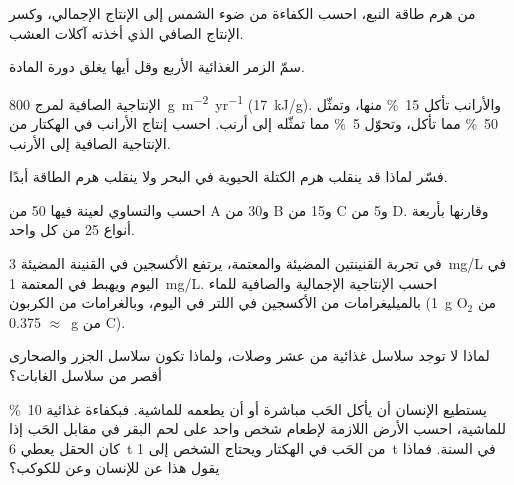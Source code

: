 \begin{exercise}[$\star$]\label{exo:b1:ecosystem-organization:3}
من هرم طاقة النبع، احسب الكفاءة من ضوء الشمس إلى الإنتاج
الإجمالي، وكسر الإنتاج الصافي الذي أخذته آكلات العشب.
\end{exercise}

\begin{exercise}[$\star$]\label{exo:b1:ecosystem-organization:4}
سمّ الزمر الغذائية الأربع وقل أيها يغلق دورة المادة.
\end{exercise}

\begin{exercise}[$\star\star$]\label{exo:b1:ecosystem-organization:5}
الإنتاجية الصافية لمرج \qty{800}{g.m^{-2}.yr^{-1}} (\qty{17}{kJ/g}).
والأرانب تأكل \qty{15}{\%} منها، وتمثّل \qty{50}{\%} مما
تأكل، وتحوّل \qty{5}{\%} مما تمثّله إلى أرنب. احسب
إنتاج الأرانب في الهكتار  من الإنتاجية الصافية
إلى الأرنب.
\end{exercise}

\begin{exercise}[$\star\star$]\label{exo:b1:ecosystem-organization:6}
فسّر لماذا قد ينقلب هرم الكتلة الحيوية في البحر ولا ينقلب هرم
الطاقة أبدًا.
\end{exercise}

\begin{exercise}[$\star\star$]\label{exo:b1:ecosystem-organization:7}
احسب  والتساوي لعينة فيها 50 من A و30 من B و15
من C و5 من D. وقارنها بأربعة أنواع 25 من كل واحد.
\end{exercise}

\begin{exercise}[$\star\star$]\label{exo:b1:ecosystem-organization:8}
في تجربة القنينتين المضيئة والمعتمة، يرتفع الأكسجين في القنينة
المضيئة \qty{3}{mg/L} في اليوم ويهبط في المعتمة
\qty{1}{mg/L}. احسب الإنتاجية الإجمالية والصافية للماء
بالميليغرامات من الأكسجين في اللتر في اليوم، وبالغرامات من الكربون
(\qty{1}{g} من $\mathrm{O_2}$ $\approx$ \qty{0.375}{g} من C).
\end{exercise}

\begin{exercise}[$\star\star$]\label{exo:b1:ecosystem-organization:9}
لماذا لا توجد سلاسل غذائية من عشر وصلات، ولماذا تكون سلاسل الجزر
والصحارى أقصر من سلاسل الغابات؟
\end{exercise}

\begin{exercise}[$\star\star\star$]\label{exo:b1:ecosystem-organization:10}
يستطيع الإنسان أن يأكل الحَب مباشرة أو أن يطعمه للماشية. فبكفاءة
غذائية \qty{10}{\%} للماشية، احسب الأرض اللازمة لإطعام
شخص واحد على لحم البقر في مقابل الحَب إذا كان الحقل يعطي
\qty{6}{t} من الحَب في الهكتار ويحتاج الشخص إلى \qty{1}{t} في السنة.
فماذا يقول هذا عن  للإنسان وعن 
للكوكب؟
\end{exercise}

